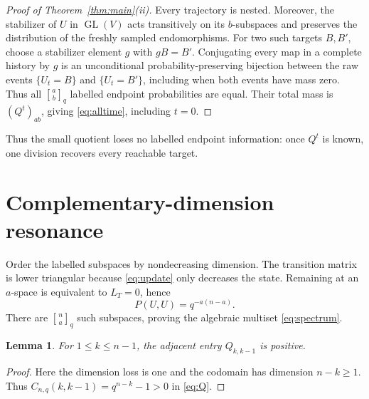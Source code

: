 \documentclass[a4paper,10pt]{amsart}
\newtheorem{lemma}[theorem]{Lemma}
\theoremstyle{remark}
\newcommand{\qbinom}[2]{\genfrac{[}{]}{0pt}{}{#1}{#2}_{q}}
\begin{document}
\begin{proof}[Proof of Theorem~\ref{thm:main}(ii)]
Every trajectory is nested.  Moreover, the stabilizer of $U$ in
$\operatorname{GL}(V)$ acts transitively on its $b$-subspaces and preserves
the distribution of the freshly sampled endomorphisms.  For two such targets
$B,B'$, choose a stabilizer element $g$ with $gB=B'$.  Conjugating every map
in a complete history by $g$ is an unconditional probability-preserving
bijection between the raw events $\{U_t=B\}$ and $\{U_t=B'\}$, including
when both events have mass zero.  Thus all $\qbinom ab$ labelled endpoint
probabilities are equal.  Their total mass is $(Q^t)_{ab}$, giving
\eqref{eq:alltime}, including $t=0$.
\end{proof}

Thus the small quotient loses no labelled endpoint information: once $Q^t$
is known, one division recovers every reachable target.

\section{Complementary-dimension resonance}

Order the labelled subspaces by nondecreasing dimension.  The transition
matrix is lower triangular because \eqref{eq:update} only decreases the
state.  Remaining at an $a$-space is equivalent to $L_T=0$, hence
\begin{equation}\label{eq:diagonal}
                         P(U,U)=q^{-a(n-a)}.
\end{equation}
There are $\qbinom na$ such subspaces, proving the algebraic multiset
\eqref{eq:spectrum}.

\begin{lemma}\label{lem:adjacent}
For $1\le k\le n-1$, the adjacent entry $Q_{k,k-1}$ is positive.
\end{lemma}

\begin{proof}
Here the dimension loss is one and the codomain has dimension $n-k\ge1$.
Thus $C_{n,q}(k,k-1)=q^{n-k}-1>0$ in \eqref{eq:Q}.
\end{proof}
\end{document}
